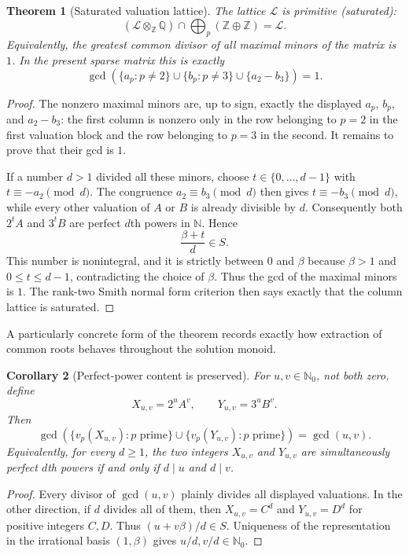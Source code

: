 \documentclass[11pt]{article}
\newtheorem{theorem}{Theorem}[section]
\newtheorem{corollary}[theorem]{Corollary}
\theoremstyle{definition}
\begin{document}
\begin{theorem}[Saturated valuation lattice]
\label{thm:saturated-valuation-lattice}
The lattice $\mathcal L$ is primitive (saturated):
\[
  (\mathcal L\otimes_{\mathbb Z}\mathbb Q)
  \cap\bigoplus_p(\mathbb Z\oplus\mathbb Z)=\mathcal L.
\]
Equivalently, the greatest common divisor of all maximal minors of the matrix
is $1$.  In the present sparse matrix this is exactly
\[
 \gcd\!\left(
   \{a_p:p\ne2\}\cup
   \{b_p:p\ne3\}\cup
   \{a_2-b_3\}
 \right)=1.
\]
\end{theorem}

\begin{proof}
The nonzero maximal minors are, up to sign, exactly the displayed $a_p$,
$b_p$, and $a_2-b_3$: the first column is nonzero only in the row belonging to
$p=2$ in the first valuation block and the row belonging to $p=3$ in the
second.  It remains to prove that their gcd is $1$.

If a number $d>1$ divided all these minors, choose
$t\in\{0,\ldots,d-1\}$ with $t\equiv-a_2\pmod d$.  The congruence
$a_2\equiv b_3\pmod d$ then gives $t\equiv-b_3\pmod d$, while every other
valuation of $A$ or $B$ is already divisible by $d$.  Consequently both
$2^tA$ and $3^tB$ are perfect $d$th powers in $\mathbb N$.  Hence
\[
  \frac{\beta+t}{d}\in S.
\]
This number is nonintegral, and it is strictly between $0$ and $\beta$ because
$\beta>1$ and $0\le t\le d-1$, contradicting the choice of $\beta$.  Thus the
gcd of the maximal minors is $1$.  The rank-two Smith normal form criterion
then says exactly that the column lattice is saturated.
\end{proof}

A particularly concrete form of the theorem records exactly how extraction of
common roots behaves throughout the solution monoid.

\begin{corollary}[Perfect-power content is preserved]
\label{cor:perfect-power-content}
For $u,v\in\mathbb N_0$, not both zero, define
\[
 X_{u,v}=2^uA^v,\qquad Y_{u,v}=3^uB^v.
\]
Then
\[
 \gcd\!\left(
   \{v_p(X_{u,v}):p\text{ prime}\}
   \cup
   \{v_p(Y_{u,v}):p\text{ prime}\}
 \right)=\gcd(u,v).
\]
Equivalently, for every $d\ge1$, the two integers $X_{u,v}$ and $Y_{u,v}$
are simultaneously perfect $d$th powers if and only if
$d\mid u$ and $d\mid v$.
\end{corollary}

\begin{proof}
Every divisor of $\gcd(u,v)$ plainly divides all displayed valuations.  In the
other direction, if $d$ divides all of them, then
$X_{u,v}=C^d$ and $Y_{u,v}=D^d$ for positive integers $C,D$.  Thus
$(u+v\beta)/d\in S$.  Uniqueness of the representation in the irrational
basis $(1,\beta)$ gives $u/d,v/d\in\mathbb N_0$.
\end{proof}
\end{document}
